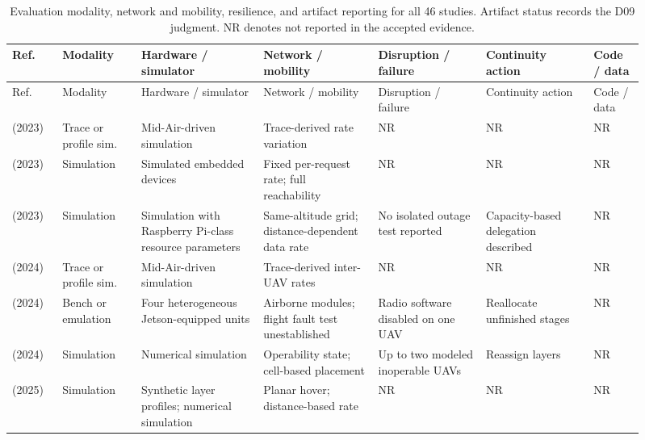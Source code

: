 \begingroup\fontsize{8}{10}\selectfont\setlength{\tabcolsep}{2.5pt}\renewcommand{\arraystretch}{1.17}
\begin{longtable}{@{}Y{0.075\linewidth}Y{0.116\linewidth}Y{0.17\linewidth}Y{0.163\linewidth}Y{0.156\linewidth}Y{0.153\linewidth}Y{0.077\linewidth}@{}}
\caption{Evaluation modality, network and mobility, resilience, and artifact reporting for all 46 studies. Artifact status records the D09 judgment. NR denotes not reported in the accepted evidence.}\label{tab:evaluation} \\
\toprule
Ref. & Modality & Hardware / simulator & Network / mobility & Disruption / failure & Continuity action & Code / data \\
\midrule
\endfirsthead
\toprule
Ref. & Modality & Hardware / simulator & Network / mobility & Disruption / failure & Continuity action & Code / data \\
\midrule
\endhead
\midrule
\endfoot
\bottomrule
\endlastfoot
\cite{R0003}\newline\mbox{(2023)} & Trace or profile sim. & Mid-Air-driven simulation & Trace-derived rate variation & NR & NR & NR \\
\cite{R0015}\newline\mbox{(2023)} & Simulation & Simulated embedded devices & Fixed per-request rate; full reachability & NR & NR & NR \\
\cite{R0082}\newline\mbox{(2023)} & Simulation & Simulation with Raspberry Pi-class resource parameters & Same-altitude grid; distance-dependent data rate & No isolated outage test reported & Capacity-based delegation described & NR \\
\cite{R0010}\newline\mbox{(2024)} & Trace or profile sim. & Mid-Air-driven simulation & Trace-derived inter-UAV rates & NR & NR & NR \\
\cite{R0062}\newline\mbox{(2024)} & Bench or emulation & Four heterogeneous Jetson-equipped units & Airborne modules; flight fault test unestablished & Radio software disabled on one UAV & Reallocate unfinished stages & NR \\
\cite{R0073}\newline\mbox{(2024)} & Simulation & Numerical simulation & Operability state; cell-based placement & Up to two modeled inoperable UAVs & Reassign layers & NR \\
\cite{R0006}\newline\mbox{(2025)} & Simulation & Synthetic layer profiles; numerical simulation & Planar hover; distance-based rate & NR & NR & NR \\

\end{longtable}
